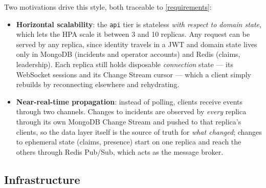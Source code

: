 \documentclass{scrartcl}
\begin{document}
Two motivations drive this style, both traceable to \cref{requirements}:
%
\begin{itemize}
  \item \textbf{Horizontal scalability}: the \texttt{api} tier is stateless \emph{with respect to domain state}, which lets the HPA scale it between 3 and 10 replicas. Any request can be served by any replica, since identity travels in a JWT and domain state lives only in MongoDB (incidents and operator accounts) and Redis (claims, leadership). Each replica still holds disposable \emph{connection} state --- its WebSocket sessions and its Change Stream cursor --- which a client simply rebuilds by reconnecting elsewhere and rehydrating.
  \item \textbf{Near-real-time propagation}: instead of polling, clients receive events through two channels. Changes to incidents are observed by \emph{every} replica through its own MongoDB Change Stream and pushed to that replica's clients, so the data layer itself is the source of truth for \emph{what changed}; changes to ephemeral state (claims, presence) start on one replica and reach the others through Redis Pub/Sub, which acts as the message broker.
\end{itemize}
 
\subsection{Infrastructure}\label{infrastructure}
 
\end{document}
